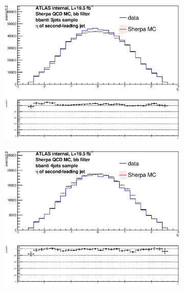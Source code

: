 \begin{figure}[phtb!]
\begin{center}
  \begin{subfigure}[$bbanti$ 3 jet category]{0.3\textwidth}\includegraphics[width=\textwidth]{MonteCarlo/figures/eta1_bbanti_3jets.eps}\end{subfigure}
  \begin{subfigure}[$bbanti$ 4 jet category]{0.3\textwidth}\includegraphics[width=\textwidth]{MonteCarlo/figures/eta1_bbanti_4jets.eps}\end{subfigure}

\end{center}
\end{figure}
